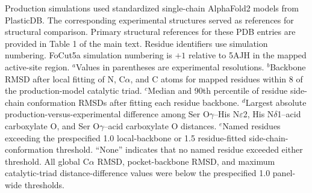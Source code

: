 \begin{table}[H]
\begin{minipage}{\linewidth}
    Production simulations used standardized single-chain AlphaFold2 models from PlasticDB. The corresponding experimental structures served as references for structural comparison. Primary structural references for these PDB entries are provided in Table 1 of the main text. Residue identifiers use simulation numbering. FoCut5a simulation numbering is $+1$ relative to 5AJH in the mapped active-site region. $^{a}$Values in parentheses are experimental resolutions. $^{b}$Backbone RMSD after local fitting of N, C$\alpha$, and C atoms for mapped residues within \SI{8}{\angstromunit} of the production-model catalytic triad. $^{c}$Median and 90th percentile of residue side-chain conformation RMSDs after fitting each residue backbone. $^{d}$Largest absolute production-versus-experimental difference among Ser O$\gamma$--His N$\varepsilon$2, His N$\delta$1--acid carboxylate O, and Ser O$\gamma$--acid carboxylate O distances. $^{e}$Named residues exceeding the prespecified \SI{1.0}{\angstromunit} local-backbone or \SI{1.5}{\angstromunit} residue-fitted side-chain-conformation threshold. ``None'' indicates that no named residue exceeded either threshold. All global C$\alpha$ RMSD, pocket-backbone RMSD, and maximum catalytic-triad distance-difference values were below the prespecified \SI{1.0}{\angstromunit} panel-wide thresholds.
  \end{minipage}
\end{table}
